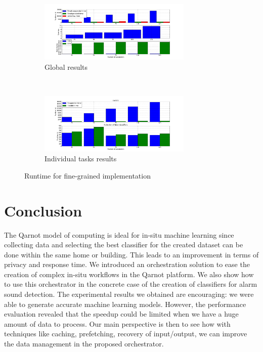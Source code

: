 \documentclass[10pt, conference, compsocconf]{IEEEtran}
\begin{document}
\begin{figure}[h]
  \begin{center}
    \begin{subfigure}{0.5\textwidth}
      \captionsetup{skip=-1pt}
      \centering
      \includegraphics[width=0.8\textwidth]{Figures/times_increasparams_global_bars.png}
      \caption{\footnotesize Global results \label{subfig:scalability_glob}}
  \end{subfigure} \\
  \begin{subfigure}{0.5\textwidth}
    \captionsetup{skip=-1pt}
    \centering
    \includegraphics[width=0.8\textwidth]{Figures/times_increasparams_individual_bars.png}
    \caption{\footnotesize Individual tasks results \label{subfig:scalability_ind}}
  \end{subfigure}
\end{center}
\caption{Runtime for fine-grained implementation \label{fig:scalability}}
\end{figure}
\section{Conclusion} \label{Conclusion}
The Qarnot model of computing is ideal for in-situ machine learning since collecting data and selecting the best classifier for the created dataset can be done within the same home or building. This leads to an improvement in terms of privacy and response time. We introduced an orchestration solution to ease the creation of complex in-situ workflows in the Qarnot platform. We also show how to use this orchestrator 
in the concrete case of the creation of classifiers for alarm sound detection. The experimental results we obtained are encouraging: 
we were able to generate accurate machine learning models. However, the performance evaluation revealed that the speedup could be limited 
when we have a huge amount of data to process. Our main perspective is then to see how with techniques like caching, prefetching, 
recovery of input/output, we can improve the data management in the proposed orchestrator. 

\def\IEEEbibitemsep{.1pt}






\end{document}
